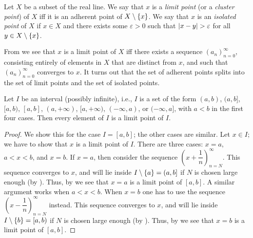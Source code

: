 \begin{defn}\label{i:9.1.18}
  Let \(X\) be a subset of the real line.
  We say that \(x\) is a \emph{limit point} (or a \emph{cluster point}) of \(X\) iff it is an adherent point of \(X \setminus \left\lbrace x\right\rbrace\).
  We say that \(x\) is an \emph{isolated point} of \(X\) if \(x \in X\) and there exists some \(\varepsilon > 0\) such that \(\left\lvert x - y\right\rvert > \varepsilon\) for all \(y \in X \setminus \left\lbrace x\right\rbrace\).
\end{defn}

\setcounter{thm}{19}
\begin{rmk}\label{i:9.1.20}
  From  we see that \(x\) is a limit point of \(X\) iff there exists a sequence \((a_n)_{n = 0}^\infty\), consisting entirely of elements in \(X\) that are distinct from \(x\), and such that \((a_n)_{n = 0}^\infty\) converges to \(x\).
  It turns out that the set of adherent points splits into the set of limit points and the set of isolated points.
\end{rmk}

\begin{lem}\label{i:9.1.21}
  Let \(I\) be an interval (possibly infinite), i.e., \(I\) is a set of the form \((a, b)\), \((a, b]\), \([a, b)\), \([a, b]\), \((a, +\infty)\), \([a, +\infty)\), \((-\infty, a)\), or \((-\infty, a]\), with \(a < b\) in the first four cases.
  Then every element of \(I\) is a limit point of \(I\).
\end{lem}

\begin{proof}
  We show this for the case \(I = [a, b]\);
  the other cases are similar.
  Let \(x \in I\);
  we have to show that \(x\) is a limit point of \(I\).
  There are three cases: \(x = a\), \(a < x < b\), and \(x = b\).
  If \(x = a\), then consider the sequence \((x + \dfrac{1}{n})_{n = N}^\infty\).
  This sequence converges to \(x\), and will lie inside \(I \setminus \left\lbrace a\right\rbrace = (a, b]\) if \(N\) is chosen large enough (by ).
  Thus, by  we see that \(x = a\) is a limit point of \([a, b]\).
  A similar argument works when \(a < x < b\).
  When \(x = b\) one has to use the sequence \((x - \dfrac{1}{n})_{n = N}^\infty\) instead.
  This sequence converges to \(x\), and will lie inside \(I \setminus \left\lbrace b\right\rbrace = [a, b)\) if \(N\) is chosen large enough (by ).
  Thus, by  we see that \(x = b\) is a limit point of \([a, b]\).
\end{proof}

